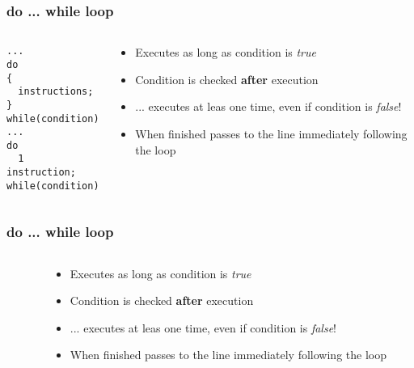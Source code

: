 \documentclass[10pt]{beamer}
\begin{document}
\begin{frame}[fragile]
  \frametitle{do ... while loop}
  \begin{columns}
    \begin{column}{0.6\textwidth}
\begin{lstlisting}
...
do
{
  instructions;
} while(condition)
...
do
  1 instruction;
while(condition)
\end{lstlisting}
    \end{column}
    \begin{column}{0.5\textwidth}
    \begin{itemize}
      \item Executes as long as condition is \textit{true}
      \item Condition is checked \textbf{after} execution
      \item ... executes at leas one time, even if condition is  \textit{false}!
      \item When finished passes to the line immediately following the loop
    \end{itemize}
    \end{column}
  \end{columns}
\end{frame}

\begin{frame}[fragile]
  \frametitle{do ... while loop}
  \begin{columns}
    \begin{column}{0.6\textwidth}
    \end{column}
    \begin{column}{0.5\textwidth}
    \begin{itemize}
      \item Executes as long as condition is \textit{true}
      \item Condition is checked \textbf{after} execution
      \item ... executes at leas one time, even if condition is  \textit{false}!
      \item When finished passes to the line immediately following the loop
    \end{itemize}
    \end{column}
  \end{columns}
\end{frame}
\end{document}
